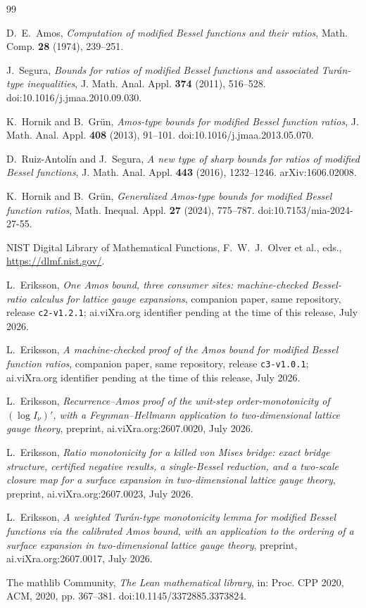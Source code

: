 \documentclass[11pt]{article}
\newcommand{\lean}[1]{\texttt{#1}}
\begin{document}
\begin{thebibliography}{99}

 D.~E.~Amos,
\emph{Computation of modified Bessel functions and their ratios},
Math. Comp. \textbf{28} (1974), 239--251.

 J.~Segura,
\emph{Bounds for ratios of modified Bessel functions and associated
Tur\'an-type inequalities},
J. Math. Anal. Appl. \textbf{374} (2011), 516--528.
doi:10.1016/j.jmaa.2010.09.030.

 K.~Hornik and B.~Gr\"un,
\emph{Amos-type bounds for modified Bessel function ratios},
J. Math. Anal. Appl. \textbf{408} (2013), 91--101.
doi:10.1016/j.jmaa.2013.05.070.

 D.~Ruiz-Antol\'in and J.~Segura,
\emph{A new type of sharp bounds for ratios of modified Bessel
functions}, J. Math. Anal. Appl. \textbf{443} (2016), 1232--1246.
arXiv:1606.02008.

 K.~Hornik and B.~Gr\"un,
\emph{Generalized Amos-type bounds for modified Bessel function
ratios}, Math. Inequal. Appl. \textbf{27} (2024), 775--787.
doi:10.7153/mia-2024-27-55.

 NIST Digital Library of Mathematical Functions,
F.~W.~J.~Olver et al., eds., \url{https://dlmf.nist.gov/}.

 L.~Eriksson,
\emph{One Amos bound, three consumer sites: machine-checked
Bessel-ratio calculus for lattice gauge expansions}, companion
paper, same repository, release \lean{c2-v1.2.1}; ai.viXra.org
identifier pending at the time of this release, July 2026.

 L.~Eriksson,
\emph{A machine-checked proof of the Amos bound for modified Bessel
function ratios}, companion paper, same repository, release
\lean{c3-v1.0.1}; ai.viXra.org identifier pending at the time of
this release, July 2026.

 L.~Eriksson,
\emph{Recurrence--Amos proof of the unit-step order-monotonicity of
$(\log I_\nu)'$, with a Feynman--Hellmann application to
two-dimensional lattice gauge theory}, preprint,
ai.viXra.org:2607.0020, July 2026.

 L.~Eriksson,
\emph{Ratio monotonicity for a killed von Mises bridge: exact bridge
structure, certified negative results, a single-Bessel reduction, and
a two-scale closure map for a surface expansion in two-dimensional
lattice gauge theory}, preprint, ai.viXra.org:2607.0023, July 2026.

 L.~Eriksson,
\emph{A weighted Tur\'an-type monotonicity lemma for modified Bessel
functions via the calibrated Amos bound, with an application to the
ordering of a surface expansion in two-dimensional lattice gauge
theory}, preprint, ai.viXra.org:2607.0017, July 2026.

 The mathlib Community,
\emph{The Lean mathematical library}, in: Proc. CPP 2020, ACM, 2020,
pp. 367--381. doi:10.1145/3372885.3373824.

\end{thebibliography}
\end{document}
